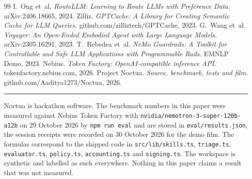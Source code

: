 \documentclass[11pt]{article}
\newcommand{\code}[1]{\texttt{#1}}
\begin{document}
\begin{thebibliography}{99}
 I.~Ong et~al. \emph{RouteLLM: Learning to Route LLMs with Preference Data.} arXiv:2406.18665, 2024.
 Zilliz. \emph{GPTCache: A Library for Creating Semantic Cache for LLM Queries.} github.com/zilliztech/GPTCache, 2023.
 G.~Wang et~al. \emph{Voyager: An Open-Ended Embodied Agent with Large Language Models.} arXiv:2305.16291, 2023.
 T.~Rebedea et~al. \emph{NeMo Guardrails: A Toolkit for Controllable and Safe LLM Applications with Programmable Rails.} EMNLP Demo, 2023.
 Nebius. \emph{Token Factory: OpenAI-compatible inference API.} tokenfactory.nebius.com, 2026.
 Project Noctua. \emph{Source, benchmark, tests and film.} github.com/Aaditya1273/Noctua, 2026.
\end{thebibliography}

\vspace{6pt}\hrule\vspace{4pt}
{\footnotesize\noindent Noctua is hackathon software. The benchmark numbers in this paper were measured against Nebius
Token Factory with \code{nvidia/nemotron-3-super-120b-a12b} on 29 October 2026 by \code{npm run eval} and are stored
in \code{eval/results.json}; the session receipts were recorded on 30 October 2026 for the demo film. The formulas
correspond to the shipped code in \code{src/lib/skills.ts}, \code{triage.ts}, \code{evaluator.ts}, \code{policy.ts},
\code{accounting.ts} and \code{signing.ts}. The workspace is synthetic and labelled as such everywhere. Nothing in this
paper claims a result that was not measured.}
\end{document}
